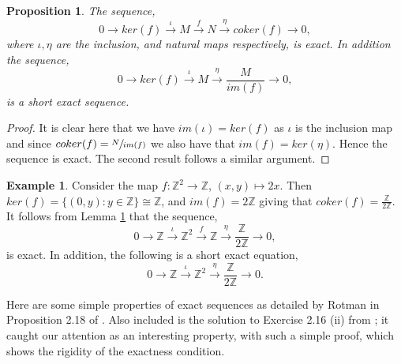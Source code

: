 \documentclass[11.5pt, twoside, a4paper, titlepage]{report}
\providecommand{\bb}[1]{\mathbb{#1}}
\theoremstyle{definition}
\newtheorem{eg}[mydef]{Example}
\theoremstyle{plain}
\newtheorem{prop}[mydef]{Proposition}
\begin{document}
\begin{prop} \label{cokerseqprop}
The sequence,
\begin{equation*}
0 \xrightarrow{} ker(f) \xrightarrow{\iota} M \xrightarrow{f} N \xrightarrow{\eta} coker(f) \xrightarrow{} 0,
\end{equation*} 
where $\iota , \eta$ are the inclusion, and natural maps respectively, is exact. In addition the sequence, 
\begin{equation*}
0\xrightarrow{} ker(f) \xrightarrow{\iota} M \xrightarrow{\eta} \frac{M}{im(f)} \xrightarrow{} 0,
\end{equation*}
is a short exact sequence.
\end{prop}
\begin{proof}
It is clear here that we have $im(\iota)=ker(f)$ as $\iota$ is the inclusion map and since $coker(f)=\sfrac{N}{im(f)}$ we also have that $im(f)=ker(\eta)$. Hence the sequence is exact. The second result follows a similar argument.
\end{proof}

\begin{eg}
Consider the map $f:\bb{Z}^2 \to \bb{Z}$, $(x, y)\mapsto 2x$. Then $ker(f)=\{(0,y):y\in \bb{Z}\}\cong \bb{Z}$, and $im(f)=2\bb{Z}$ giving that $coker(f)=\frac{\bb{Z}}{2\bb{Z}}$. It follows from Lemma \ref{cokerseqprop} that the sequence, 
\begin{equation*}
0 \xrightarrow{} \bb{Z} \xrightarrow{\iota} \bb{Z}^2 \xrightarrow{f} \bb{Z} \xrightarrow{\eta} \frac{\bb{Z}}{2\bb{Z}} \xrightarrow{} 0,
\end{equation*}
is exact. In addition, the following is a short exact equation,
\begin{equation*}
0\xrightarrow{} \bb{Z} \xrightarrow{\iota} \bb{Z}^2 \xrightarrow{\eta} \frac{\bb{Z}}{2\bb{Z}} \xrightarrow{}0.
\end{equation*}
\end{eg}

Here are some simple properties of exact sequences as detailed by Rotman in Proposition 2.18 of \cite{Rotman}. Also included is the solution to Exercise 2.16 (ii) from \cite{Rotman}; it caught our attention as an interesting property, with such a simple proof, which shows the rigidity of the exactness condition.
\end{document}
